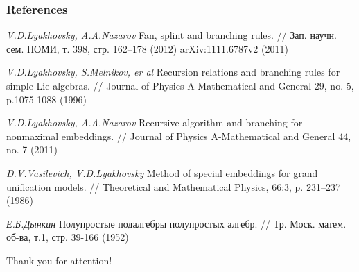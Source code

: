 \documentclass[pdftex]{beamer}
\theoremstyle{definition} \newtheorem{Def}{Definition}
\begin{document}
\begin{frame}
  \frametitle{References}
  \begin{thebibliography}{99}

    {\it V.D.Lyakhovsky, A.A.Nazarov}
    Fan, splint and branching rules.
    // Зап. научн. сем. ПОМИ, т. 398, стр. 162–178 (2012)
    arXiv:1111.6787v2 (2011)

    {\it V.D.Lyakhovsky, S.Melnikov, er al}
    Recursion relations and branching rules for simple Lie algebras.
    // Journal of Physics A-Mathematical and General 29, no. 5, p.1075-1088 (1996)

    {\it V.D.Lyakhovsky, A.A.Nazarov}
    Recursive algorithm and branching for nonmaximal embeddings.
    // Journal of Physics A-Mathematical and General 44, no. 7 (2011)

    {\it D.V.Vasilevich, V.D.Lyakhovsky}
    Method of special embeddings for grand unification models.
    // Theoretical and Mathematical Physics, 66:3, p. 231–237 (1986)

    {\it Е.Б.Дынкин}
    Полупростые подалгебры полупростых алгебр.
    // Тр. Моск. матем. об-ва, т.1, стр. 39-166 (1952)

  \end{thebibliography}
\end{frame}

\begin{frame}[c]
  \begin{center}
    \Large{Thank you for attention!}    
  \end{center}



\end{frame}
\end{document}

